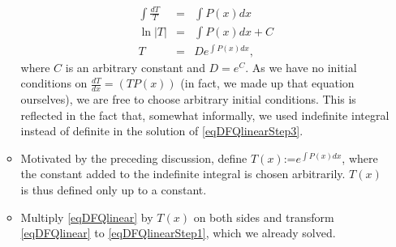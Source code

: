\documentclass[12pt]{book}
\newcommand{\eqdef}{\textbf{:=}}
\begin{document}
\begin{itemize}
\begin{itemize}
\begin{equation}
\begin{array}{rcl}
\int\frac{dT}{T}&=&\int P(x)dx\\
\ln |T|&=&  \int P(x)dx+C\\
T&=&De^{\int P(x)dx}, 
\end{array}
\end{equation}
where $C$ is an arbitrary constant and $D=e^C$. As we have no initial conditions on $\frac{dT}{dx}= (TP(x))$ (in fact, we made up that equation ourselves), we are free to choose arbitrary initial conditions. This is reflected in the fact that, somewhat informally, we used indefinite integral instead of definite in the solution of \eqref{eqDFQlinearStep3}.
\item Motivated by the preceding discussion, define $T(x)\eqdef e^{\int P(x)dx}$, where the constant added to the indefinite integral is chosen arbitrarily. $T(x)$ is thus defined only up to a constant.
\item Multiply \eqref{eqDFQlinear} by $T(x)$ on both sides and transform \eqref{eqDFQlinear} to \eqref{eqDFQlinearStep1}, which we already solved.
\end{itemize}
\end{itemize}
\end{document}
